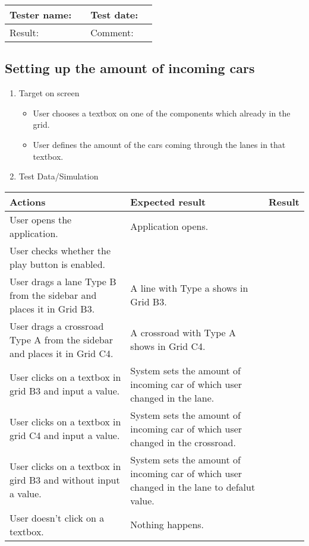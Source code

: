 \begin{tabularx}{\textwidth}{|p{3cm}X|p{3cm}X|}\hline
	Tester name: &  & Test date: & \\\hline
	Result: &   \pass & Comment: & \\\hline
\end{tabularx}

\newpage

\subsection{Setting up the amount of incoming cars }

\begin{enumerate}
	
	\item Target on screen
	\begin{itemize}
		\item User chooses a textbox on one of the components which already in the grid.
		\item User defines the amount of the cars coming through the lanes in that textbox.
	\end{itemize}
	\item Test Data/Simulation
\end{enumerate}	
	\begin{tabularx}{\textwidth}{|X|X|p{2.5cm}|}\hline
		Actions & Expected result & Result \\\hline
		User opens the application.& Application opens. &  \pass \\\hline
		User checks whether the play button is enabled. & &  \pass \\\hline
		User drags a lane Type B from the sidebar and places it in Grid B3. & A line with Type a shows in Grid B3. & \pass \\\hline
		User drags a crossroad Type A from the sidebar and places it in Grid C4. & A crossroad with Type A shows in Grid C4. & \pass \\\hline
		User clicks on a textbox in grid B3 and input a value. & System sets the amount of incoming car of which user changed in the lane. & \pass \\\hline
		User clicks on a textbox in grid C4 and input a value. & System sets the amount of incoming car of which user changed in the crossroad. & \pass \\\hline
		User clicks on a textbox in gird B3 and without input a value. & System sets the amount of incoming car of which user changed in the lane to defalut value. & \pass \\\hline
		User doesn't click on a textbox. & Nothing happens. &  \pass \\\hline
	\end{tabularx}
	

